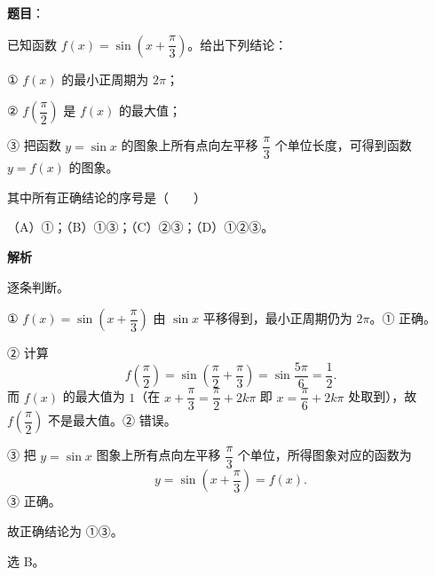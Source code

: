 \begin{answer}

\textbf{题目}：

已知函数 $f(x)=\sin\left(x+\dfrac\pi3\right)$。给出下列结论：

① $f(x)$ 的最小正周期为 $2\pi$；

② $f\left(\dfrac\pi2\right)$ 是 $f(x)$ 的最大值；

③ 把函数 $y=\sin x$ 的图象上所有点向左平移 $\dfrac\pi3$ 个单位长度，可得到函数 $y=f(x)$ 的图象。

其中所有正确结论的序号是\mbox{（　　）}

（A）①；（B）①③；（C）②③；（D）①②③。

\textbf{解析}

逐条判断。

① $f(x)=\sin\left(x+\dfrac\pi3\right)$ 由 $\sin x$ 平移得到，最小正周期仍为 $2\pi$。① 正确。

② 计算
\nopagebreak[4]
\[f\left(\frac\pi2\right)=\sin\left(\frac\pi2+\frac\pi3\right)=\sin\frac{5\pi}6=\frac12 .\]
而 $f(x)$ 的最大值为 $1$（在 $x+\dfrac\pi3=\dfrac\pi2+2k\pi$ 即 $x=\dfrac\pi6+2k\pi$ 处取到），故 $f\left(\dfrac\pi2\right)$ 不是最大值。② 错误。

③ 把 $y=\sin x$ 图象上所有点向左平移 $\dfrac\pi3$ 个单位，所得图象对应的函数为
\nopagebreak[4]
\[y=\sin\left(x+\frac\pi3\right)=f(x).\]
③ 正确。

故正确结论为 ①③。

选 B。


\end{answer}
